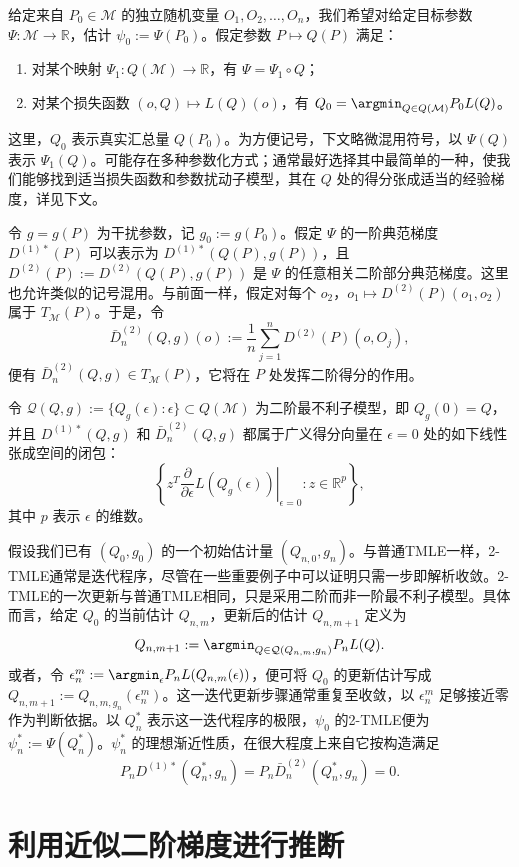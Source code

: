 给定来自 $P_0\in\mathcal M$ 的独立随机变量 $O_1,O_2,\ldots,O_n$，我们希望对给定目标参数 $\Psi:\mathcal M\to\mathbb R$，估计 $\psi_0:=\Psi(P_0)$。假定参数 $P\mapsto Q(P)$ 满足：
\begin{enumerate}
\item 对某个映射 $\Psi_1:Q(\mathcal M)\to\mathbb R$，有 $\Psi=\Psi_1\circ Q$；
\item 对某个损失函数 $(o,Q)\mapsto L(Q)(o)$，有 $Q_0=\argmin_{Q\in Q(\mathcal M)}P_0L(Q)$。
\end{enumerate}
这里，$Q_0$ 表示真实汇总量 $Q(P_0)$。为方便记号，下文略微混用符号，以 $\Psi(Q)$ 表示 $\Psi_1(Q)$。可能存在多种参数化方式；通常最好选择其中最简单的一种，使我们能够找到适当损失函数和参数扰动子模型，其在 $Q$ 处的得分张成适当的经验梯度，详见下文。

令 $g=g(P)$ 为干扰参数，记 $g_0:=g(P_0)$。假定 $\Psi$ 的一阶典范梯度 $D^{(1)*}(P)$ 可以表示为 $D^{(1)*}(Q(P),g(P))$，且 $D^{(2)}(P):=D^{(2)}(Q(P),g(P))$ 是 $\Psi$ 的任意相关二阶部分典范梯度。这里也允许类似的记号混用。与前面一样，假定对每个 $o_2$，$o_1\mapsto D^{(2)}(P)(o_1,o_2)$ 属于 $T_{\mathcal M}(P)$。于是，令
\[
\bar D_n^{(2)}(Q,g)(o):=\frac1n\sum_{j=1}^nD^{(2)}(P)(o,O_j),
\]
便有 $\bar D_n^{(2)}(Q,g)\in T_{\mathcal M}(P)$，它将在 $P$ 处发挥二阶得分的作用。

令 $\mathcal Q(Q,g):=\{Q_g(\epsilon):\epsilon\}\subset Q(\mathcal M)$ 为二阶最不利子模型，即 $Q_g(0)=Q$，并且 $D^{(1)*}(Q,g)$ 和 $\bar D_n^{(2)}(Q,g)$ 都属于广义得分向量在 $\epsilon=0$ 处的如下线性张成空间的闭包：
\[
\left\{\left.z^T\frac{\partial}{\partial\epsilon}L(Q_g(\epsilon))\right|_{\epsilon=0}:z\in\mathbb R^p\right\},
\]
其中 $p$ 表示 $\epsilon$ 的维数。

假设我们已有 $(Q_0,g_0)$ 的一个初始估计量 $(Q_{n,0},g_n)$。与普通TMLE一样，2-TMLE通常是迭代程序，尽管在一些重要例子中可以证明只需一步即解析收敛。2-TMLE的一次更新与普通TMLE相同，只是采用二阶而非一阶最不利子模型。具体而言，给定 $Q_0$ 的当前估计 $Q_{n,m}$，更新后的估计 $Q_{n,m+1}$ 定义为
\[
Q_{n,m+1}:=\argmin_{Q\in\mathcal Q(Q_{n,m},g_n)}P_nL(Q).
\]
或者，令 $\epsilon_n^m:=\argmin_\epsilon P_nL(Q_{n,m}(\epsilon))$，便可将 $Q_0$ 的更新估计写成 $Q_{n,m+1}:=Q_{n,m,g_n}(\epsilon_n^m)$。这一迭代更新步骤通常重复至收敛，以 $\epsilon_n^m$ 足够接近零作为判断依据。以 $Q_n^*$ 表示这一迭代程序的极限，$\psi_0$ 的2-TMLE便为 $\psi_n^*:=\Psi(Q_n^*)$。$\psi_n^*$ 的理想渐近性质，在很大程度上来自它按构造满足
\[
P_nD^{(1)*}(Q_n^*,g_n)=P_n\bar D_n^{(2)}(Q_n^*,g_n)=0.
\]

\section{利用近似二阶梯度进行推断}


